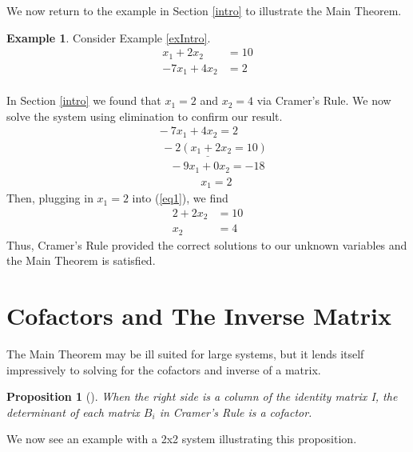 \documentclass[11pt,reqno]{amsart}
\newtheorem{proposition}[theorem]{Proposition}
\theoremstyle{definition}
\newtheorem{example}[theorem]{Example}
\begin{document}
We now return to the example in Section \ref{intro} to illustrate the Main Theorem.

\begin{example}
Consider Example \ref{exIntro}. 
\begin{align} \label{eq1}
     x_1 + 2x_2 &= 10 \\ 
    -7x_1 + 4x_2 &= 2\\ \nonumber
\end{align} 

In Section \ref{intro} we found that $x_1 = 2$ and $x_2=4$ via Cramer's Rule.  We now solve the system using elimination to confirm our result.
\begin{equation*}
\begin{array}{c}
    \;\;\;-7x_1 + 4x_2 = 2 \\
    \underline{\phantom{-}-2(x_1 + 2x_2  = 10)} \\
    \;\;\;\;\;\;\;-9x_1 + 0x_2 = -18\\
    \;\;\;\;\;\;\;\;\;\;\;\;\;\;\;\;\; x_1 = 2
\end{array}
\end{equation*}
Then, plugging in $x_1=2$ into (\ref{eq1}), we find 
\begin{align*} 
     2 + 2x_2 &= 10 \\ 
     x_2 &= 4
\end{align*}
Thus, Cramer's Rule provided the correct solutions to our unknown variables and the Main Theorem is satisfied. 
\end{example}


\section{Cofactors and The Inverse Matrix}
\label{sec:applications}

The Main Theorem may be ill suited for large systems, but it lends itself impressively to solving for the cofactors and inverse of a matrix. 

\begin{proposition}[{\cite[5.3]{strang}}]\label{4.1}
When the right side is a column of the identity matrix I, the
determinant of each matrix $B_i$ in Cramer's Rule is a cofactor.
\end{proposition}

We now see an example with a 2x2 system illustrating this proposition.
\end{document}
